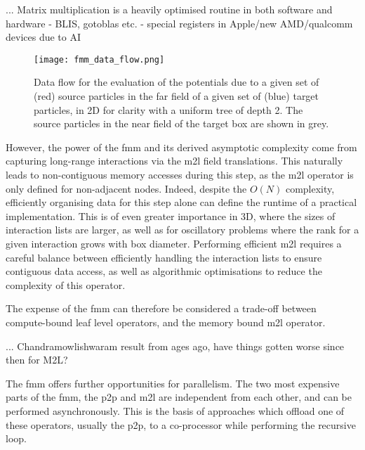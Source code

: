 ... Matrix multiplication is a heavily optimised routine in both software and hardware
    - BLIS, gotoblas etc.
    - special registers in Apple/new AMD/qualcomm devices due to AI

\begin{figure}[h]
    \texttt{[image: fmm\_data\_flow.png]}
    \caption{Data flow for the evaluation of the potentials due to a given set of (red) source particles in the far field of a given set of (blue) target particles, in 2D for clarity with a uniform tree of depth 2. The source particles in the near field of the target box are shown in grey.}
    \label{fig:chpt:fmm:data_flow}
\end{figure}

However, the power of the \acrshort{fmm} and its derived asymptotic complexity come from capturing long-range interactions via the \acrshort{m2l} field translations. This naturally leads to non-contiguous memory accesses during this step, as the \acrshort{m2l} operator is only defined for non-adjacent nodes. Indeed, despite the $O(N)$ complexity, efficiently organising data for this step alone can define the runtime of a practical implementation. This is of even greater importance in 3D, where the sizes of interaction lists are larger, as well as for oscillatory problems where the rank for a given interaction grows with box diameter. Performing efficient \acrshort{m2l} requires a careful balance between efficiently handling the interaction lists to ensure contiguous data access, as well as algorithmic optimisations to reduce the complexity of this operator.

The expense of the \acrshort{fmm} can therefore be considered a trade-off between compute-bound leaf level operators, and the memory bound \acrshort{m2l} operator.

... Chandramowlishwaram result from ages ago, have things gotten worse since then for M2L?


The \acrshort{fmm} offers further opportunities for parallelism. The two most expensive parts of the \acrshort{fmm}, the \acrshort{p2p} and \acrshort{m2l} are independent from each other, and can be performed asynchronously. This is the basis of approaches which offload one of these operators, usually the \acrshort{p2p}, to a co-processor while performing the recursive loop.

